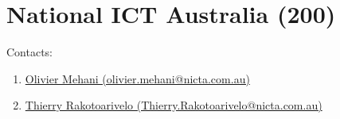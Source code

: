 \section{National ICT Australia (200)}
\label{sec:NICTA}

Contacts:\begin{enumerate}
 \item {}\href{mailto:olivier.mehani@nicta.com.au}{Olivier Mehani (olivier.mehani@nicta.com.au)}
 \item {}\href{mailto:Thierry.Rakotoarivelo@nicta.com.au}{Thierry Rakotoarivelo (Thierry.Rakotoarivelo@nicta.com.au)}
\end{enumerate}

